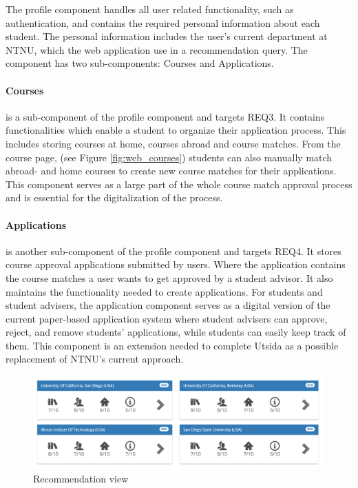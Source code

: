 The profile component handles all user related functionality, such as authentication, and contains the required personal information about each student. The personal information includes the user's current department at NTNU, which the web application use in a recommendation query. The component has two sub-components: Courses and Applications.

\paragraph{Courses} 
is a sub-component of the profile component and targets REQ3. It contains functionalities which enable a student to organize their application process. This includes storing courses at home, courses abroad and course matches. From the course page, (see Figure \ref{fig:web_courses}) students can also manually match abroad- and home courses to create new course matches for their applications. This component serves as a large part of the whole course match approval process and is essential for the digitalization of the process.

\paragraph{Applications} 
is another sub-component of the profile component and targets REQ4. It stores course approval applications submitted by users. Where the application contains the course matches a user wants to get approved by a student advisor. It also maintains the functionality needed to create applications. For students and student advisers, the application component serves as a digital version of the current paper-based application system where student advisers can approve, reject, and remove students' applications, while students can easily keep track of them. This component is an extension needed to complete Utsida as a possible replacement of NTNU's current approach.

\begin{figure}[h]
    \centering
    \includegraphics[width=1\textwidth]{fig/utsida_screenshots/result_1_cut_high.png}
    \caption{Recommendation view}
    \label{fig:web_results_1}
\end{figure}

